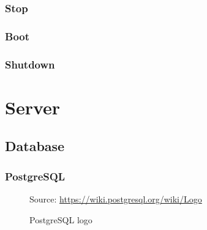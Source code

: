 \subsubsection{Stop}
\label{subsubsec:implementation_installer_services_stop}

\subsubsection{Boot}
\label{subsubsec:implementation_installer_services_boot}

\subsubsection{Shutdown}
\label{subsubsec:implementation_installer_services_shutdown}

\section{Server}
\label{sec:implementation_server}

\subsection{Database}
\label{subsec:implementation_server_database}

\subsubsection{PostgreSQL}
\label{subsubsec:implementation_server_database_postgresql}

\begin{figure} %
  \centering
  \def\stackalignment{r} %
  {\scriptsize \parbox[t]{\linewidth}{ Source: \url{https://wiki.postgresql.org/wiki/Logo}} }
  \caption{PostgreSQL logo}
\end{figure}

